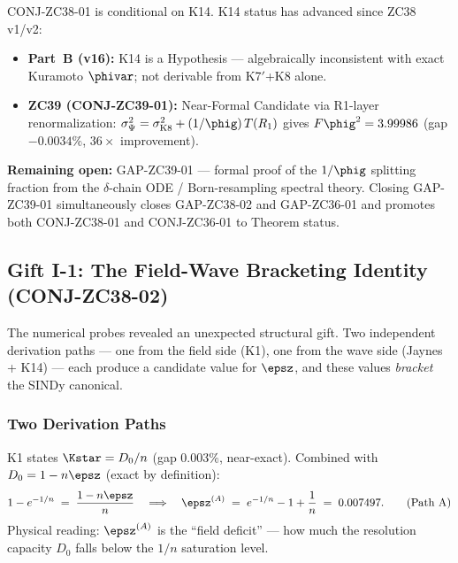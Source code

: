 \documentclass[12pt, a4paper]{article}
\begin{document}
\begin{openqbox}[title={GAP-ZC38-02: Formal Derivation of K14 --- Near-Formal via ZC39}]
CONJ-ZC38-01 is conditional on K14.
K14 status has advanced since ZC38 v1/v2:

\begin{itemize}[noitemsep,leftmargin=2em]
  \item \textbf{Part~B (v16):} K14 is a Hypothesis --- algebraically inconsistent
    with exact Kuramoto $\phivar$; not derivable from K7$'$+K8 alone.
  \item \textbf{ZC39 (CONJ-ZC39-01):} Near-Formal Candidate via R1-layer renormalization:
    $\sigma^2_\Psi = \sigma^2_{\rm K8} + (1/\phig)\,T(R_1)$
    gives $F\phig^2 = 3.99986$ (gap $-0.0034\%$, $36\times$ improvement).
\end{itemize}

\textbf{Remaining open:} GAP-ZC39-01 --- formal proof of the $1/\phig$
splitting fraction from the $\delta$-chain ODE / Born-resampling spectral theory.
Closing GAP-ZC39-01 simultaneously closes GAP-ZC38-02 and GAP-ZC36-01
and promotes both CONJ-ZC38-01 and CONJ-ZC36-01 to Theorem status.
\end{openqbox}


\subsection{Gift I-1: The Field-Wave Bracketing Identity (CONJ-ZC38-02)}
\label{sec:gift}

The numerical probes revealed an unexpected structural gift.
Two independent derivation paths --- one from the field side (K1),
one from the wave side (Jaynes + K14) --- each produce a candidate
value for $\epsz$, and these values \emph{bracket} the SINDy canonical.

\subsubsection{Two Derivation Paths}

\begin{formalbox}[title={Path A: Field Side via K1-Exact}]
K1 states $\Kstar = D_0/n$ (gap $0.003\%$, near-exact).
Combined with $D_0 = 1 - n\epsz$ (exact by definition):
\[
  1 - e^{-1/n} \;=\; \frac{1-n\epsz}{n}
  \quad\Longrightarrow\quad
  \epsz^{(A)} \;=\; e^{-1/n} - 1 + \frac{1}{n}
  \;=\; 0.007497.
  \tag{Path A}
\]
Physical reading: $\epsz^{(A)}$ is the ``field deficit'' ---
how much the resolution capacity $D_0$ falls below the $1/n$ saturation level.
\end{formalbox}
\end{document}
